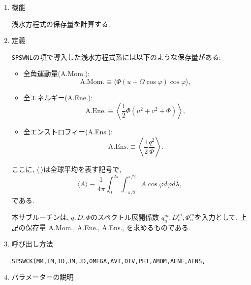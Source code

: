 \documentclass[a4j,fleqn]{jarticle}
\begin{document}
\begin{enumerate}

\item 機能

浅水方程式の保存量を計算する.

\item 定義

{\tt SPSWNL}の項で導入した浅水方程式系には以下のような保存量がある:
\begin{itemize}
\item 全角運動量(A.Mom.):
\begin{equation}
\mbox{A.Mom.}\equiv\langle\Phi(u+\Omega\cos\varphi)\cos\varphi\rangle,
\end{equation}
\item 全エネルギー(A.Ene.):
\begin{equation}
\mbox{A.Ene.}\equiv\left\langle\frac12\Phi(u^2+v^2+\Phi)\right\rangle,
\end{equation}
\item 全エンストロフィー(A.Ens.):
\begin{equation}
\mbox{A.Ens.}\equiv\left\langle\frac12\frac{q^2}{\Phi}\right\rangle.
\end{equation}
\end{itemize}
ここに, $\langle\ \rangle$は全球平均を表す記号で,
\begin{equation}
\langle A\rangle\equiv\frac1{4\pi}\int^{2\pi}_0\int^{\pi/2}_{-\pi/2}
A\cos\varphi d\varphi d\lambda,
\end{equation}
である.

本サブルーチンは, $q,D,\Phi$のスペクトル展開係数
$q^m_n,D^m_n,\Phi^m_n$を入力として, 
上記の保存量 A.Mom., A.Ene., A.Ens., 
を求めるものである.

\item 呼び出し方法 

{\tt SPSWCK(MM,IM,ID,JM,JD,OMEGA,AVT,DIV,PHI,AMOM,AENE,AENS,}\\
\hspace*{10em}{\tt RN,IT,T,Y,IP4,P4,R4,IA,A,Q,WS,WW)}
  
\item パラメーターの説明


\end{enumerate}
\end{document}
